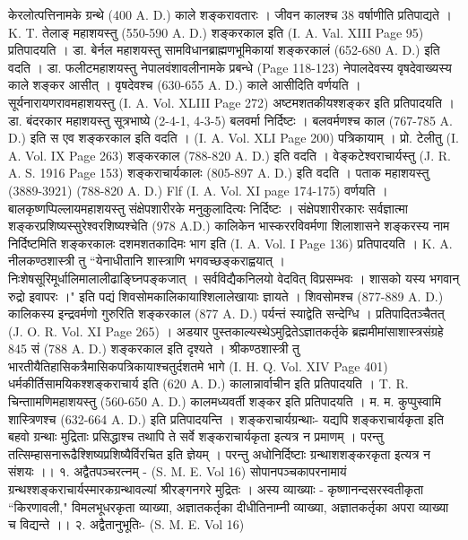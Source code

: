 केरलोत्पत्तिनामके ग्रन्थे (400 A. D.) काले शङ्करावतारः । जीवन कालश्च 38 वर्षाणीति प्रतिपाद्यते । K. T. तेलाङ् महाशयस्तु (550-590 A. D.) शङ्करकाल इति  (I. A. Val. XIII Page 95) प्रतिपादयति । डा. बेर्नल महाशयस्तु सामविधानब्राह्मणभूमिकायां शङ्करकालं (652-680 A. D.) इति वदति । डा. फलीटमहाशयस्तु नेपालवंशावलीनामके प्रबन्धे  (Page 118-123) नेपालदेवस्य वृषदेवाख्यस्य काले शङ्कर आसीत् । वृषदेवश्च (630-655 A. D.) काले आसीदिति वर्णयति । सूर्यनारायणरावमहाशयस्तु (I. A. Vol. XLIII Page 272) अष्टमशतकीयश्शङ्कर इति प्रतिपादयति । डा. बंदरकार महाशयस्तु सूत्रभाष्ये (2-4-1, 4-3-5) बलवर्मा निर्दिष्टः । बलवर्मणश्च काल (767-785 A. D.) इति स एव शङ्करकाल इति वदति । (I. A. Vol. XLI Page 200) पत्रिकायाम् । प्रो. टेलीतु (I. A. Vol. IX Page 263) शङ्करकाल (788-820 A. D.) इति वदति । वेङ्कटेश्वराचार्यस्तु (J. R. A. S. 1916 Page 153) शङ्कराचार्यकालः (805-897 A. D.) इति वदति । पताक महाशयस्तु (3889-3921) (788-820 A. D.) Flf (I. A. Vol. XI page 174-175) वर्णयति । बालकृष्णप्पिल्लायमहाशयस्तु संक्षेपशारीरके मनुकुलादित्यः निर्दिष्टः । संक्षेपशारीरकारः सर्वज्ञात्मा शङ्करप्रशिष्यस्सुरेश्वरशिष्यश्चेति (978 A.D.) कालिकेन भास्कररविवर्मणा शिलाशासने शङ्करस्य नाम निर्दिष्टमिति शङ्करकालः दशमशतकादिमः भाग इति (I. A. Vol. I Page 136) प्रतिपादयति । K. A. नीलकण्ठशास्त्री तु ``येनाधीतानि शास्त्राणि भगवच्छङ्कराह्वयात् । निःशेषसूरिमूर्धालिमालालीढाङ्घ्निपङ्कजात् । सर्वविद्यैकनिलयो वेदवित् विप्रसम्भवः । शासको यस्य भगवान् रुद्रो इवापरः ।" इति पद्यं शिवसोमकालिकायाश्शिलालेखायाः ज्ञायते । शिवसोमश्च (877-889 A. D.) कालिकस्य इन्द्रवर्मणो गुरुरिति शङ्करकाल (877 A. D.) पर्यन्तं स्याद्वेति सन्देग्धि । प्रतिपादितञ्चैतत् (J. O. R. Vol. XI Page 265) । अडयार पुस्तकाल्यस्थेऽमुद्रितेऽज्ञातकर्तृके ब्रह्ममीमांसाशास्त्रसंग्रहे 845 सं (788 A. D.) शङ्करकाल इति दृश्यते । श्रीकण्ठशास्त्री तु भारतीयैतिहासिकत्रैमासिकपत्रिकायाश्चतुर्दशतमे भागे (I. H. Q. Vol. XIV Page 401) धर्मकीर्तिसामयिकश्शङ्कराचार्य इति (620 A. D.) कालान्नार्वाचीन इति प्रतिपादयति । T. R. चिन्ताामणिमहाशयस्तु (560-650 A. D.) कालमध्यवर्ती शङ्कर इति प्रतिपादयति । म. म. कुप्पुस्वामि शास्त्रिणश्च (632-664 A. D.) इति प्रतिपादयन्ति । 
शङ्कराचार्यग्रन्थाः-
यद्यपि शङ्कराचार्यकृता इति बहवो ग्रन्थाः मुद्रिताः प्रसिद्धाश्च तथापि ते सर्वे शङ्कराचार्यकृता इत्यत्र न प्रमाणम् । परन्तु तत्सिम्हासनारूढैश्शिष्यप्रशिष्यैर्विरचित इति ज्ञेयम् । परन्तु अधोनिर्दिष्टाः ग्रन्थाशशङ्करकृता इत्यत्र न संशयः ।।
१. अद्वैतपञ्चरत्नम् - (S. M. E. Vol 16)
सोपानपञ्चकापरनामायं ग्रन्थश्शङ्कराचार्यस्मारकग्रन्थावल्यां श्रीरङ्गनगरे मुद्रितः । अस्य व्याख्याः - कृष्णानन्दसरस्वतीकृता ``किरणावली," विमलभूधरकृता व्याख्या, अज्ञातकर्तृका दीधीतिनाम्नी व्याख्या, अज्ञातकर्तृका अपरा व्याख्या च विद्यन्ते ।।
२. अद्वैतानुभूतिः- (S. M. E. Vol 16)
